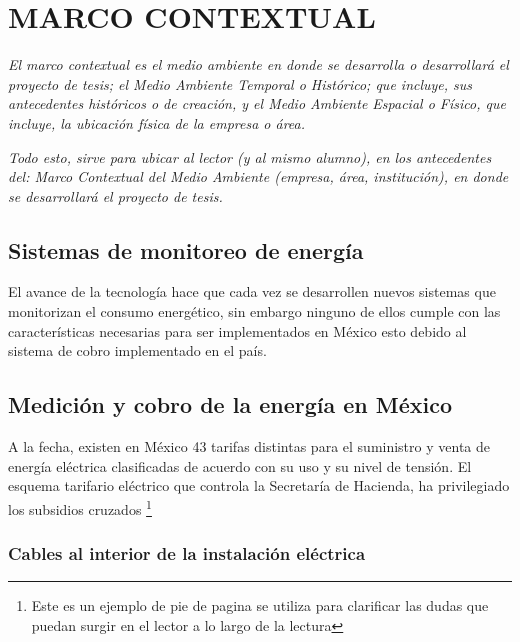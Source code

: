 

\chapter{ MARCO CONTEXTUAL }

\textit{El marco contextual es el medio ambiente en donde se desarrolla o desarrollará el proyecto de tesis; el Medio Ambiente Temporal o Histórico; que incluye, sus antecedentes históricos o de creación, y el Medio Ambiente Espacial o Físico, que incluye, la ubicación física de la empresa o área.}

\textit{ Todo esto, sirve para ubicar al lector (y al mismo alumno), en los antecedentes del: Marco Contextual del Medio Ambiente (empresa, área, institución), en donde se desarrollará el proyecto de tesis.}


\section{ Sistemas de monitoreo de energía }

El avance de la tecnología hace que cada vez se desarrollen nuevos sistemas que monitorizan el consumo energético, sin embargo ninguno de ellos cumple con las características necesarias para ser implementados en México esto debido al sistema de cobro implementado en el país. 

\section{ Medición y cobro de la energía en México }

A la fecha, existen en México 43 tarifas distintas para el suministro y venta de energía eléctrica clasificadas de acuerdo con su uso y su nivel de tensión. El esquema tarifario eléctrico que controla la Secretaría de Hacienda, ha privilegiado los subsidios cruzados \footnote{Este es un ejemplo de pie de pagina se utiliza para clarificar las dudas que puedan surgir en el lector a lo largo de la lectura } 

\subsection{ Cables al interior de la instalación eléctrica }


